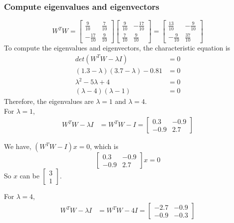 \documentclass{article}
\begin{document}
\subsubsection*{Compute eigenvalues and eigenvectors}
\[
W^T W = \begin{bmatrix} \frac{9}{10} & \frac{7}{10} \\ -\frac{17}{10} & \frac{9}{10} \end{bmatrix} \begin{bmatrix} \frac{9}{10} & -\frac{17}{10} \\ \frac{7}{10} & \frac{9}{10} \end{bmatrix} = \begin{bmatrix} \frac{13}{10} & -\frac{9}{10} \\ -\frac{9}{10} & \frac{37}{10} \end{bmatrix}
\]
To compute the eigenvalues and eigenvectors, the characteristic equation is 
\begin{align*}
    det(W^T W - \lambda I) &= 0 \\
    (1.3 - \lambda)(3.7 - \lambda) - 0.81 &= 0 \\
    \lambda ^ 2 - 5 \lambda + 4 &= 0 \\
    (\lambda - 4)(\lambda - 1) &= 0
\end{align*}
Therefore, the eigenvalues are $\lambda = 1$ and $\lambda = 4$. \\
For $\lambda = 1$, 
\begin{align*}
    W^T W - \lambda I &= W^T W - I = \begin{bmatrix} 0.3 & -0.9 \\ -0.9 & 2.7 \end{bmatrix}
\end{align*}

We have, $(W^T W - I)x = 0$, which is
\[
\begin{bmatrix} 0.3 & -0.9 \\ -0.9 & 2.7 \end{bmatrix} x = 0
\]
So $x$ can be $\begin{bmatrix} 3 \\ 1 \end{bmatrix}$.

For $\lambda = 4$, 
\begin{align*}
    W^T W - \lambda I &= W^T W - 4I = \begin{bmatrix} -2.7 & -0.9 \\ -0.9 & -0.3 \end{bmatrix}
\end{align*}
\end{document}
